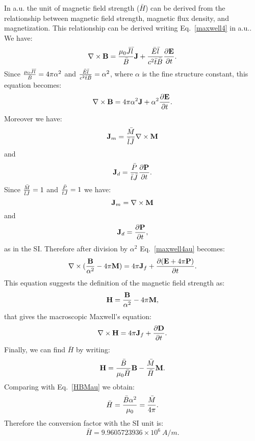 \documentclass[12pt,a4paper]{article}
\def\barh{9.9605723936\times 10^{6}}
\begin{document}
{\color{web-blue} In a.u. the unit of magnetic field strength ($\bar H$) 
can be derived from the relationship between magnetic field strength,
magnetic flux density, and magnetization. This relationship can
be derived writing Eq.~\ref{maxwell4} in a.u..
We have:
\begin{equation}
\nabla \times {\bf B}= {\mu_0 \bar J \bar l \over \bar B} {\bf J} + 
{\bar E \bar l \over c^2 \bar t \bar B} {\partial {\bf E} \over
\partial t}.
\label{maxwell4gen}
\end{equation}
Since ${\mu_0 \bar J \bar l \over \bar B}=4 \pi \alpha^2$ and 
${\bar E \bar l \over c^2 \bar t \bar B}=\alpha^2$, where $\alpha$ 
is the fine structure constant, this equation becomes:
\begin{equation}
\nabla \times {\bf B}= {4 \pi \alpha^2} {\bf J} + {\alpha^2} 
{\partial {\bf E} \over \partial t}.
\label{maxwell4au}
\end{equation}
Moreover we have:
\begin{equation}
{\bf J}_m={\bar M \over \bar l \bar J} \nabla \times {\bf M}
\end{equation}
and 
\begin{equation}
{\bf J}_d={\bar P \over \bar t \bar J} {\partial {\bf P} \over \partial t}.
\end{equation}
Since ${\bar M \over \bar l \bar J}=1$ and 
${\bar P \over \bar t \bar J}=1$ we have:
\begin{equation}
{\bf J}_m= \nabla \times {\bf M}
\end{equation}
and 
\begin{equation}
{\bf J}_d={\partial {\bf P} \over \partial t},
\end{equation}
as in the SI. Therefore after division by $\alpha^2$ 
Eq.~\ref{maxwell4au} becomes:
\begin{equation}
\nabla \times ({{\bf B}\over \alpha^2} -4\pi {\bf M})= 
{4 \pi} {\bf J}_f +  {\partial ({\bf E}+4\pi {\bf P}) \over \partial t}.
\label{maxwell4au1}
\end{equation}
This equation suggests the definition of the magnetic field strength as:
\begin{equation}
{\bf H}={{\bf B}\over \alpha^2} -4\pi {\bf M},
\label{HBMau}
\end{equation}
that gives the macroscopic Maxwell's equation:
\begin{equation}
\nabla \times {\bf H}= 
{4 \pi} {\bf J}_f +  {\partial {\bf D} \over \partial t}.
\end{equation}
Finally, we can find $\bar H$ by writing:
\begin{equation}
{\bf H} = {\bar B \over \mu_0 \bar H} {\bf B} - {\bar M \over \bar H} {\bf M}.
\label{HBMgen}
\end{equation}
Comparing with Eq.~\ref{HBMau} we obtain:
\begin{equation}
\bar H={\bar B \alpha^2 \over \mu_0} = {\bar M \over 4 \pi}.
\end{equation}
Therefore the conversion factor with the SI unit is:
\begin{equation}
\bar H = \barh\ A/m.
\end{equation}
}
\\
\end{document}
